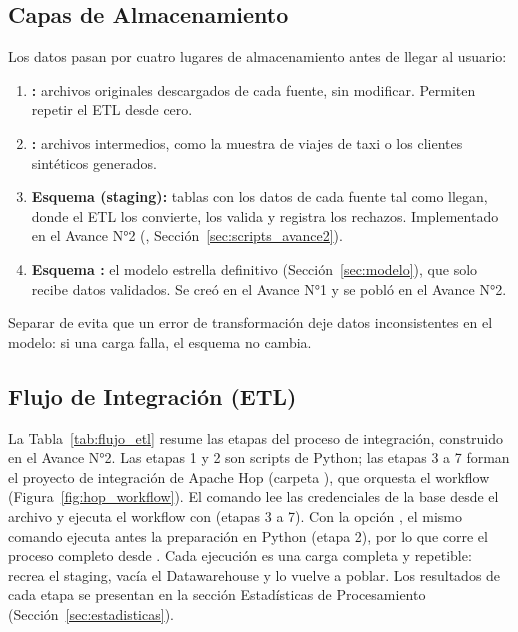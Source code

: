 \subsection{Capas de Almacenamiento}

Los datos pasan por cuatro lugares de almacenamiento antes de llegar al
usuario:

\begin{enumerate}[leftmargin=*]
  \item \textbf{:} archivos originales descargados de cada
        fuente, sin modificar. Permiten repetir el ETL desde cero.
  \item \textbf{:} archivos intermedios, como la muestra
        de viajes de taxi o los clientes sintéticos generados.
  \item \textbf{Esquema  (staging):} tablas con los datos de cada
        fuente tal como llegan, donde el ETL los convierte, los valida y
        registra los rechazos. Implementado en el Avance N°2
        (, Sección~\ref{sec:scripts_avance2}).
  \item \textbf{Esquema :} el modelo estrella definitivo
        (Sección~\ref{sec:modelo}), que solo recibe datos validados. Se creó
        en el Avance N°1 y se pobló en el Avance N°2.
\end{enumerate}

Separar  de  evita que un error de transformación deje datos
inconsistentes en el modelo: si una carga falla, el esquema  no
cambia.

\subsection{Flujo de Integración (ETL)}
\label{sec:flujo_etl}

La Tabla~\ref{tab:flujo_etl} resume las etapas del proceso de integración,
construido en el Avance N°2. Las etapas 1 y 2 son scripts de Python; las
etapas 3 a 7 forman el proyecto de integración de Apache Hop (carpeta
), que orquesta el workflow 
(Figura~\ref{fig:hop_workflow}). El comando 
lee las credenciales de la base desde el archivo  y ejecuta el
workflow con  (etapas 3 a 7). Con la opción , el
mismo comando ejecuta antes la preparación en Python (etapa 2), por lo que
 corre el proceso completo desde
. Cada ejecución es una
carga completa y repetible: recrea el staging, vacía el Datawarehouse y lo
vuelve a poblar. Los resultados de cada etapa se presentan en la sección
Estadísticas de Procesamiento (Sección~\ref{sec:estadisticas}).

